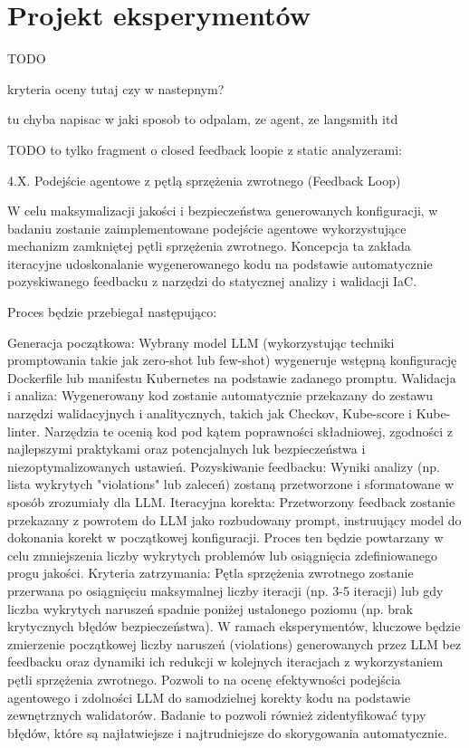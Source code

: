 \clearpage %
\section{Projekt eksperymentów}

TODO

kryteria oceny tutaj czy w nastepnym?

tu chyba napisac w jaki sposob to odpalam, ze agent, ze langsmith itd



TODO to tylko fragment o closed feedback loopie z static analyzerami:

4.X. Podejście agentowe z pętlą sprzężenia zwrotnego (Feedback Loop)

W celu maksymalizacji jakości i bezpieczeństwa generowanych konfiguracji, w badaniu zostanie zaimplementowane podejście agentowe wykorzystujące mechanizm zamkniętej pętli sprzężenia zwrotnego. Koncepcja ta zakłada iteracyjne udoskonalanie wygenerowanego kodu na podstawie automatycznie pozyskiwanego feedbacku z narzędzi do statycznej analizy i walidacji IaC.

Proces będzie przebiegał następująco:

Generacja początkowa: Wybrany model LLM (wykorzystując techniki promptowania takie jak zero-shot lub few-shot) wygeneruje wstępną konfigurację Dockerfile lub manifestu Kubernetes na podstawie zadanego promptu.
Walidacja i analiza: Wygenerowany kod zostanie automatycznie przekazany do zestawu narzędzi walidacyjnych i analitycznych, takich jak Checkov, Kube-score i Kube-linter. Narzędzia te ocenią kod pod kątem poprawności składniowej, zgodności z najlepszymi praktykami oraz potencjalnych luk bezpieczeństwa i niezoptymalizowanych ustawień.
Pozyskiwanie feedbacku: Wyniki analizy (np. lista wykrytych "violations" lub zaleceń) zostaną przetworzone i sformatowane w sposób zrozumiały dla LLM.
Iteracyjna korekta: Przetworzony feedback zostanie przekazany z powrotem do LLM jako rozbudowany prompt, instruujący model do dokonania korekt w początkowej konfiguracji. Proces ten będzie powtarzany w celu zmniejszenia liczby wykrytych problemów lub osiągnięcia zdefiniowanego progu jakości.
Kryteria zatrzymania: Pętla sprzężenia zwrotnego zostanie przerwana po osiągnięciu maksymalnej liczby iteracji (np. 3-5 iteracji) lub gdy liczba wykrytych naruszeń spadnie poniżej ustalonego poziomu (np. brak krytycznych błędów bezpieczeństwa).
W ramach eksperymentów, kluczowe będzie zmierzenie początkowej liczby naruszeń (violations) generowanych przez LLM bez feedbacku oraz dynamiki ich redukcji w kolejnych iteracjach z wykorzystaniem pętli sprzężenia zwrotnego. Pozwoli to na ocenę efektywności podejścia agentowego i zdolności LLM do samodzielnej korekty kodu na podstawie zewnętrznych walidatorów. Badanie to pozwoli również zidentyfikować typy błędów, które są najłatwiejsze i najtrudniejsze do skorygowania automatycznie.

